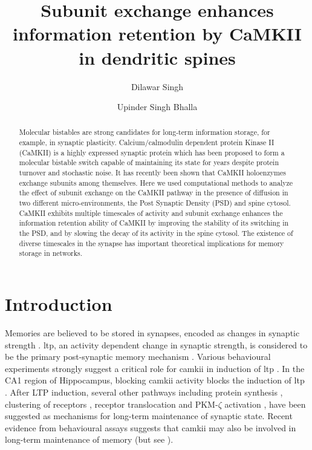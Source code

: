\documentclass[9pt,lineno]{elife}
\title{Subunit exchange enhances information retention by CaMKII in dendritic spines}
\author[]{Dilawar Singh}
\author[]{Upinder Singh Bhalla}
\affil[]{National Centre for Biological Sciences Bangalore, Tata Institute of Fundamental Research}
\begin{document}
\maketitle

\begin{abstract}\label{abstract} 
Molecular bistables are strong candidates for long-term information storage, for
example, in synaptic plasticity. Calcium/calmodulin dependent protein Kinase II
(CaMKII) is a highly expressed synaptic protein which has been proposed to form
a molecular bistable switch capable of maintaining its state for years despite
protein turnover and stochastic noise. It has recently been shown that CaMKII
holoenzymes exchange subunits among themselves. Here we used computational
methods to analyze the effect of subunit exchange on the CaMKII pathway in the
presence of diffusion in two different micro-environments, the Post Synaptic
Density (PSD) and spine cytosol. CaMKII exhibits multiple timescales of activity
and subunit exchange enhances the information retention ability of CaMKII by
improving the stability of its switching in the PSD, and by slowing the decay of
its activity in the spine cytosol. The existence of diverse timescales in the
synapse has important theoretical implications for memory storage in networks.
\end{abstract}



\section{Introduction}\label{introduction}

Memories are believed to be stored in synapses, encoded as changes in synaptic
strength \citep{hebb_organization_2005,takeuchi_synaptic_2014,choi_interregional_2018}.
\gls{ltp}, an activity dependent change in synaptic strength, is considered to
be the primary post-synaptic memory mechanism
\citep{bliss_expression_2013,mayford_synapses_2012}. Various behavioural
experiments strongly suggest a critical role for \gls{camkii} in induction of
\gls{ltp} \citep{lucchesi_novel_2011,giese_autophosphorylation_1998}. In
the CA1 region of Hippocampus, blocking \gls{camkii} activity blocks the
induction of \gls{ltp} \citep{chang_camkii_2017}.  After LTP induction, several
other pathways including protein synthesis \citep{aslam_translational_2009},
clustering of receptors \citep{shouval_clusters_2005}, receptor translocation
\citep{hayer_molecular_2005} and PKM-$\zeta$ activation
\citep{sacktor_memory_2012}, have been suggested as mechanisms for long-term
maintenance of synaptic state. Recent evidence from behavioural assays suggests
that \gls{camkii} may also be involved in long-term maintenance of memory
\citep{rossetti_memory_2017} (but see \citep{chang_camkii_2017}).
\end{document}
